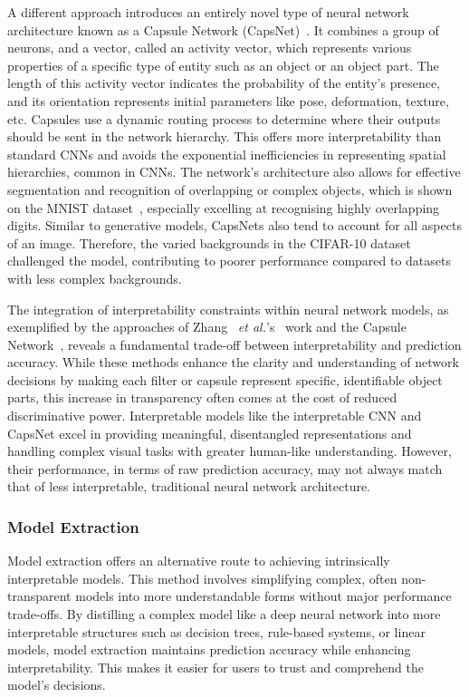 A different approach introduces an entirely novel type of neural network architecture known as a Capsule Network (CapsNet)~\cite{SabourFH17}. It combines a group of neurons, and a vector, called an activity vector, which represents various properties of a specific type of entity such as an object or an object part. The length of this activity vector indicates the probability of the entity's presence, and its orientation represents initial parameters like pose, deformation, texture, etc. Capsules use a dynamic routing process to determine where their outputs should be sent in the network hierarchy. This offers more interpretability than standard CNNs and avoids the exponential inefficiencies in representing spatial hierarchies, common in CNNs. The network's architecture also allows for effective segmentation and recognition of overlapping or complex objects, which is shown on the MNIST dataset~\cite{deng2012mnist}, especially excelling at recognising highly overlapping digits. Similar to generative models, CapsNets also tend to account for all aspects of an image. Therefore, the varied backgrounds in the CIFAR-10 dataset~\cite{cifar} challenged the model, contributing to poorer performance compared to datasets with less complex backgrounds.


The integration of interpretability constraints within neural network models, as exemplified by the approaches of Zhang ~\textit{et al.}'s~\cite{ZhangWZ18a} work and the Capsule Network~\cite{SabourFH17}, reveals a fundamental trade-off between interpretability and prediction accuracy. While these methods enhance the clarity and understanding of network decisions by making each filter or capsule represent specific, identifiable object parts, this increase in transparency often comes at the cost of reduced discriminative power. Interpretable models like the interpretable CNN and CapsNet excel in providing meaningful, disentangled representations and handling complex visual tasks with greater human-like understanding. However, their performance, in terms of raw prediction accuracy, may not always match that of less interpretable, traditional neural network architecture.

\subsubsection{Model Extraction}
\label{sec:extraction}

Model extraction offers an alternative route to achieving intrinsically interpretable models. This method involves simplifying complex, often non-transparent models into more understandable forms without major performance trade-offs. By distilling a complex model like a deep neural network into more interpretable structures such as decision trees, rule-based systems, or linear models, model extraction maintains prediction accuracy while enhancing interpretability. This makes it easier for users to trust and comprehend the model's decisions.

